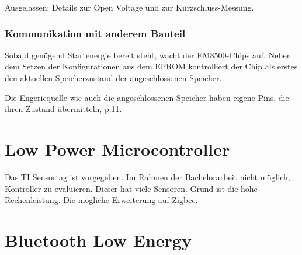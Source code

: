 Ausgelassen: Details zur Open Voltage und zur Kurzschluss-Messung.




\subsubsection{Kommunikation mit anderem Bauteil}

Sobald genügend Startenergie bereit steht, wacht der EM8500-Chips auf. Neben dem Setzen der Konfigurationen aus dem EPROM kontrolliert der Chip als erstes den aktuellen Speicherzustand der angeschlossenen Speicher.

Die Engeriequelle wie auch die angeschlossenen Speicher haben eigene Pins, die ihren Zustand übermitteln\cite{datasheet_EM85}, p.11. 




\section{Low Power Microcontroller }
Das TI Sensortag ist vorgegeben. Im Rahmen der Bachelorarbeit nicht möglich, Kontroller zu evaluieren. Dieser hat viele Sensoren.
Grund ist die hohe Rechenleistung. Die mögliche Erweiterung auf Zigbee. 

\section{Bluetooth Low Energy}





